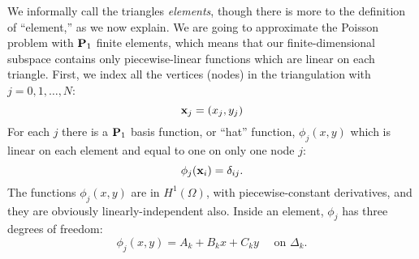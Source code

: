 We informally call the triangles \emph{elements}, though there is more to the definition of ``element,'' as we now explain.  We are going to approximate the Poisson problem with $\mathbf{P}_1$ finite elements, which means that our finite-dimensional subspace contains only piecewise-linear functions which are linear on each triangle.  First, we index all the vertices (nodes) in the triangulation with $j=0,1,\dots,N$:
\begin{equation*}
\mathbf{x}_j = (x_j,y_j)
\end{equation*}
For each $j$ there is a $\mathbf{P}_1$ basis function, or ``hat'' function, $\phi_j(x,y)$ which is linear on each element and equal to one on only one node $j$:%
\begin{equation*}
\phi_j(\mathbf{x}_i) = \delta_{ij}.
\end{equation*}
The functions $\phi_j(x,y)$ are in $H^1(\Omega)$, with piecewise-constant derivatives, and they are obviously linearly-independent also.
Inside an element, $\phi_j$ has three degrees of freedom:
\begin{equation*}
\phi_j(x,y) = A_k + B_k x + C_k y \quad \text{ on } \Delta_k.
\end{equation*}

